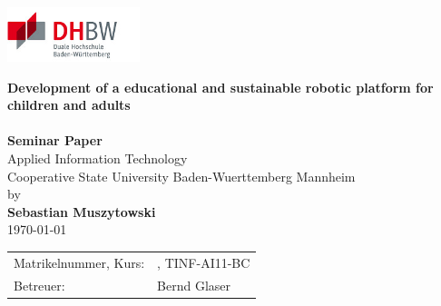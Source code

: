 \documentclass[	a4paper,11pt,oneside,			%
		listof=totoc,bibliography=totoc,	%
		titlepage,				%
		headsepline,				%
		BCOR5mm,	 			%
		2.1headlines,				%
		numbers=noenddot,			%
		parskip=full]{scrreprt}			%
\newcommand{\titel}{Development of a educational and sustainable robotic platform for children and adults}
\newcommand{\untertitel}{}
\newcommand{\arbeittyp}{Seminar Paper}
\newcommand{\bsctyp}{}
\newcommand{\studiengang}{Applied Information Technology}
\newcommand{\autor}{Sebastian Muszytowski}
\newcommand{\matrikelnr}{8410692}
\newcommand{\kurs}{TINF-AI11-BC}
\newcommand{\firma}{}
\newcommand{\dauer}{}
\newcommand{\betreuerdhbw}{Bernd Glaser}
\newcommand{\betreuerfirma}{}
\begin{document}
\clearpage
\pagestyle{empty}
\renewcommand*{\chapterpagestyle}{empty}

\setcounter{secnumdepth}{3}	%
\setcounter{tocdepth}{3}
\rmfamily			%

\begin{titlepage}

\sffamily 								%
				
\begin{flushright}
\includegraphics[scale=0.5]{images/dhbwlogo.png}\\[20ex] %
\end{flushright}

\begin{center}

\huge{\textbf{\titel}}\\[1.5ex]
\Large{\textbf{\untertitel}}\\[5ex]
\LARGE{\textbf{\arbeittyp}}\\[2ex]
\Large{\studiengang}\\[1ex]
\normalsize{Cooperative State University Baden-Wuerttemberg Mannheim}\\[6ex]
by\\[1ex] \textbf{\autor} \\[6ex]
\today \\[18ex]


\end{center}
\vfill
\begin{flushleft}

\begin{tabular}{ll}
Matrikelnummer, Kurs: 			& \quad \matrikelnr, \kurs \\
Betreuer: & \quad \betreuerdhbw \\ [5ex]

\end{tabular} 
\end{flushleft}

\end{titlepage}
\onehalfspacing
\singlespacing
\end{document}
